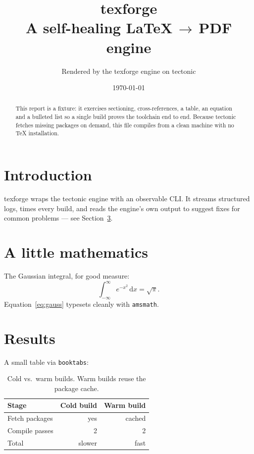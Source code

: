 \documentclass[11pt,a4paper]{article}
\title{\textbf{texforge}\\\large A self-healing \LaTeX\,$\rightarrow$\,PDF engine}
\author{Rendered by the texforge engine on tectonic}
\date{\today}
\begin{document}
\maketitle

\begin{abstract}
This report is a fixture: it exercises sectioning, cross-references, a table, an
equation and a bulleted list so a single build proves the toolchain end to end.
Because tectonic fetches missing packages on demand, this file compiles from a
clean machine with no \TeX{} installation.
\end{abstract}

\tableofcontents
\vspace{1em}

\section{Introduction}
\label{sec:intro}
texforge wraps the tectonic engine with an observable CLI. It streams structured
logs, times every build, and reads the engine's own output to suggest fixes for
common problems --- see Section~\ref{sec:results}.

\section{A little mathematics}
The Gaussian integral, for good measure:
\begin{equation}
  \int_{-\infty}^{\infty} e^{-x^2}\,\mathrm{d}x = \sqrt{\pi}.
  \label{eq:gauss}
\end{equation}
Equation~\eqref{eq:gauss} typesets cleanly with \texttt{amsmath}.

\section{Results}
\label{sec:results}
A small table via \texttt{booktabs}:

\begin{table}[h]
  \centering
  \begin{tabular}{lrr}
    \toprule
    Stage & Cold build & Warm build \\
    \midrule
    Fetch packages & yes & cached \\
    Compile passes & 2   & 2 \\
    Total          & slower & fast \\
    \bottomrule
  \end{tabular}
  \caption{Cold vs.\ warm builds. Warm builds reuse the package cache.}
  \label{tab:builds}
\end{table}
\end{document}
